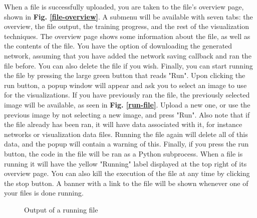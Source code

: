\noindent When a file is successfully uploaded, you are taken to the file's overview page, shown in \textbf{Fig. \ref{file-overview}}. A submenu will be available with seven tabs: the overview, the file output, the training progress, and the rest of the visualization techniques. The overview page shows some information about the file, as well as the contents of the file. You have the option of downloading the generated network, assuming that you have added the network saving callback and ran the file before. You can also delete the file if you wish. Finally, you can start running the file by pressing the large green button that reads "Run". Upon clicking the run button, a popup window will appear and ask you to select an image to use for the visualizations. If you have previously ran the file, the previously selected image will be available, as seen in \textbf{Fig. \ref{run-file}}. Upload a new one, or use the previous image by not selecting a new image, and press "Run". Also note that if the file already has been ran, it will have data associated with it, for instance networks or visualization data files. Running the file again will delete all of this data, and the popup will contain a warning of this. Finally, if you press the run button, the code in the file will be ran as a Python subprocess. When a file is running it will have the yellow "Running" label displayed at the top right of its overview page. You can also kill the execution of the file at any time by clicking the stop button. A banner with a link to the file will be shown whenever one of your files is done running.\\


\begin{figure}[h!]
    \centering
        \caption{Output of a running file}
        \label{output-tab}
\end{figure}

